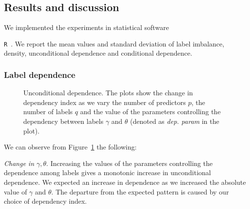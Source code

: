 \documentclass[review]{elsarticle}
\begin{document}
	
	\subsection{Results and discussion}
	
	We implemented the experiments in statistical software {\texttt{R}~\citep{RR}. We report the mean values and standard deviation of label imbalance, density, unconditional dependence and conditional dependence.
		
		\subsubsection{Label dependence}
		
		\begin{figure}[H]
			\begin{center}
			\end{center}
			\caption{Unconditional dependence. The plots show the change in dependency index as we vary the number of predictors $p$, the number of labels $q$ and the value of the parameters controlling the dependency between labels $\gamma$ and $\theta$ (denoted as \emph{dep. param} in the plot).}
			\label{fig:results:dep}
		\end{figure}
		
		We can observe from Figure~\ref{fig:results:dep} the following:
		
		\emph{Change in $\gamma,\theta$}. Increasing the values of the parameters controlling the dependence among labels gives a monotonic increase in unconditional dependence. We expected an increase in dependence as we increased the absolute value of $\gamma$ and $\theta$. The departure from the expected pattern is caused by our choice of dependency index. 
		
}
\end{document}
